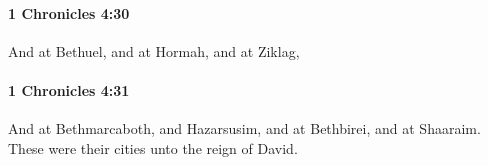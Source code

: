 		\paragraph{1 Chronicles 4:30} %
			\label{1CHRONICLES-4-30}

			And at Bethuel, and at Hormah, and at Ziklag,


		\paragraph{1 Chronicles 4:31} %
			\label{1CHRONICLES-4-31}

			And at Bethmarcaboth, and Hazarsusim, and at Bethbirei, and at Shaaraim. These were their cities unto the reign of David.


